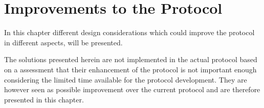 \chapter{Improvements to the Protocol}
In this chapter different design considerations which could improve the protocol in different aspects, will be presented.

The solutions presented herein are not implemented in the actual protocol based on a assessment that their enhancement of the protocol is not important enough considering the limited time available for the protocol development. 
They are however seen as possible improvement over the current protocol and are therefore presented in this chapter. 



